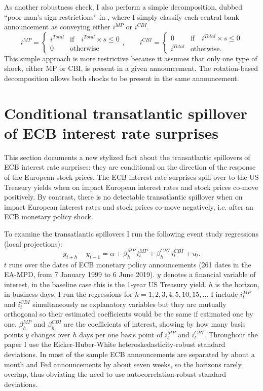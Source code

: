 \documentclass[a4paper,12pt]{article}
\begin{document}
As another robustness check, I also perform a simple decomposition, dubbed ``poor man's sign restrictions'' in \cite{Jarocinski_Karadi_2020}, where
I simply classify each central bank announcement as conveying either $i^{MP}$ or $i^{CBI}$.
\begin{equation}
i^{MP} = \begin{cases} i^{Total} &\text{if} \quad  i^{Total}\times s\le0\\ 0 &\text{otherwise}\end{cases},\qquad
i^{CBI} = \begin{cases} 0 &\text{if} \quad  i^{Total}\times s\le0\\ i^{Total} &\text{otherwise.}\end{cases}
\end{equation}
This simple approach is more restrictive because it assumes that only one type of shock, either
MP or CBI, is present in a given announcement. The rotation-based decomposition
allows both shocks to be present in the same announcement.

\section{Conditional transatlantic spillover of ECB interest rate surprises}

This section documents a new stylized fact about the transatlantic spillovers of ECB interest rate
surprises: they are conditional on the direction of the response of the European stock prices.
The ECB interest rate surprises spill over to the US Treasury yields
when on impact European interest rates and stock prices co-move positively.
By contrast, there is no detectable transatlantic spillover when on impact
European interest rates and stock prices co-move negatively, i.e. after an ECB monetary policy shock.

To examine the transatlantic spillovers I run the following event study regressions (local projections):
\begin{equation}
y^{}_{t+h}-y^{}_{t-1} = \alpha + \beta^{MP}_h\, i^{MP}_t + \beta^{CBI}_h\, i^{CBI}_t + u_t.\label{eq: event study reg 2}
\end{equation}
$t$ runs over the dates of ECB monetary policy announcements (261 dates in the EA-MPD, from 7 January 1999 to 6 June 2019). $y^{}$ denotes a financial variable of interest, in the baseline case this is the 1-year US Treasury yield. 
$h$ is the horizon, in business days. I run the regressions for $h=1,2,3,4,5,10,15,...$
I include $i^{MP}_t$ and $i^{CBI}_t$ simultaneously as explanatory variables but they are mutually orthogonal so their estimated coefficients would be the same if estimated one by one.
$\beta_h^{MP}$ and $\beta_h^{CBI}$ are the coefficients of interest, showing by how many basis points $y$ changes over $h$ days per one basis point of $i^{MP}_t$ and $i^{CBI}_t$. Throughout the paper I use the Eicker-Huber-White heteroskedasticity-robust standard deviations. In most of the sample ECB announcements are separated by about a month and Fed announcements by about seven weeks, so the horizons rarely overlap, thus obviating the need to use autocorrelation-robust standard deviations.
\end{document}

